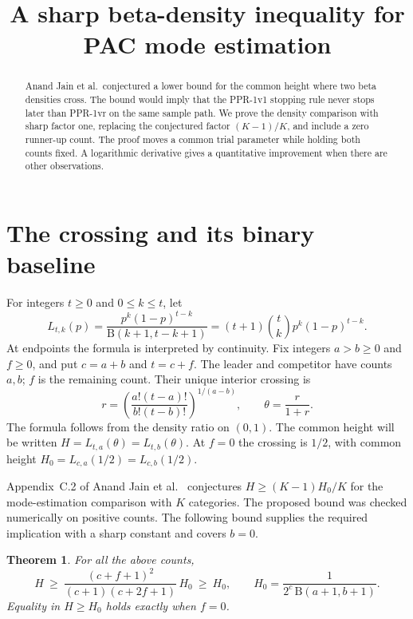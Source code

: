\documentclass[11pt,a4paper]{amsart}
\title[A sharp beta-density inequality]{A sharp beta-density inequality for PAC mode estimation}
\date{}
\newtheorem{theorem}{Theorem}
\begin{document}
\begin{abstract}
Anand Jain et al.\ conjectured a lower bound for the common height where two beta densities cross. The bound would imply that the PPR-1v1 stopping rule never stops later than PPR-1vr on the same sample path. We prove the density comparison with sharp factor one, replacing the conjectured factor $(K-1)/K$, and include a zero runner-up count. The proof moves a common trial parameter while holding both counts fixed. A logarithmic derivative gives a quantitative improvement when there are other observations.
\end{abstract}
\maketitle

\section{The crossing and its binary baseline}
For integers $t\ge0$ and $0\le k\le t$, let
\[
 L_{t,k}(p)=\frac{p^k(1-p)^{t-k}}{\mathrm{B}(k+1,t-k+1)}
          =(t+1)\binom{t}{k}p^k(1-p)^{t-k}.
\]
At endpoints the formula is interpreted by continuity. Fix integers $a>b\ge0$ and $f\ge0$, and put $c=a+b$ and $t=c+f$. The leader and competitor have counts $a,b$; $f$ is the remaining count. Their unique interior crossing is
\[
 r=\left(\frac{a!(t-a)!}{b!(t-b)!}\right)^{1/(a-b)},
 \qquad \theta=\frac{r}{1+r}.
\]
The formula follows from the density ratio on $(0,1)$. The common height will be written $H=L_{t,a}(\theta)=L_{t,b}(\theta)$. At $f=0$ the crossing is $1/2$, with common height $H_0=L_{c,a}(1/2)=L_{c,b}(1/2)$.

Appendix~C.2 of Anand Jain et al.\ \cite[PDF p.~19]{aj} conjectures $H\ge (K-1)H_0/K$ for the mode-estimation comparison with $K$ categories. The proposed bound was checked numerically on positive counts. The following bound supplies the required implication with a sharp constant and covers $b=0$.

\begin{theorem}\label{thm:bound}
For all the above counts,
\[
     H\ \ge\ \frac{(c+f+1)^2}{(c+1)(c+2f+1)}\,H_0\ \ge\ H_0,
 \qquad H_0=\frac{1}{2^c\,\mathrm{B}(a+1,b+1)}.
\]
Equality in $H\ge H_0$ holds exactly when $f=0$.
\end{theorem}
\end{document}
